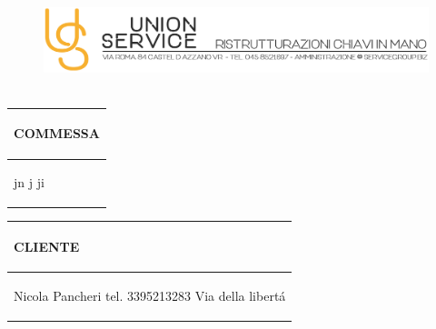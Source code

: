 \documentclass[a4paper]{article}
\begin{document}
                        \begin{figure}[!t]
                        \includegraphics[width=15.8cm, height=3cm]{intestazioneAlta2.jpg}
                        \end{figure}

                        \noindent\begin{tabular}{| L{72.2mm} |}
                            \hline
                            \vspace{2.5mm}
                            \begin{spacing}{0}
                            \textbf{COMMESSA}
                            \end{spacing}\\
                            \hline
                            \vspace{4mm}
                            \begin{spacing}{1.2}

                        jn \newline j \newline ji
                          \end{spacing}\\
                            \hline
                          \end{tabular}
                          \quad
                          \begin{tabular}{ | R{72.2mm} | }
                            \hline
                            \vspace{2.5mm}
                            \begin{spacing}{0}
                            \textbf{CLIENTE}
                            \end{spacing}\\
                            \hline
                            \vspace{4mm}
                            \begin{spacing}{1.2}

                       Nicola Pancheri \newline tel. 3395213283 \newline Via della libert\'a
                          \end{spacing}\\
                            \hline
                          \end{tabular}
\end{document}
